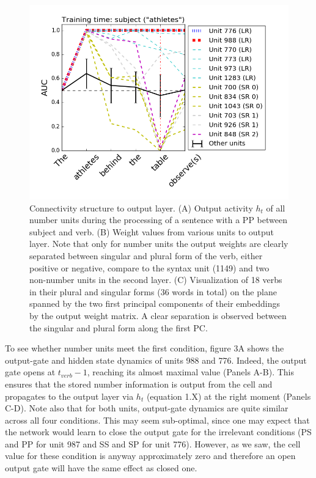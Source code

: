 \begin{figure}[t]
\centering
\includegraphics[width=\textwidth]{Figures/Figure4_GAT_SR_vs_LR.png}
\caption{Connectivity structure to output layer. (A) Output activity $h_t$ of all number units during the processing of a sentence with a PP between subject and verb. (B) Weight values from various units to output layer. Note that only for number units the output weights are clearly separated between singular and plural form of the verb, either positive or negative, compare to the syntax unit (1149) and two non-number units in the second layer. (C) Visualization of 18 verbs in their plural and singular forms (36 words in total) on the plane spanned by the two first principal components of their embeddings by the output weight matrix. A clear separation is observed between the singular and plural form along the first PC.}
\end{figure}

To see whether number units meet the first condition, figure 3A shows the output-gate and hidden state dynamics of units 988 and 776. Indeed, the output gate opens at $t_{verb}-1$, reaching its almost maximal value (Panels A-B). This ensures that the stored number information is output from the cell and propagates to the output layer via $h_t$ (equation 1.X) at the right moment (Panels C-D). Note also that for both units, output-gate dynamics are quite similar across all four conditions. This may seem sub-optimal, since one may expect that the network would learn to close the output gate for the irrelevant conditions (PS and PP for unit 987 and SS and SP for unit 776). However, as we saw, the cell value for these condition is anyway approximately zero and therefore an open output gate will have the same effect as closed one.

